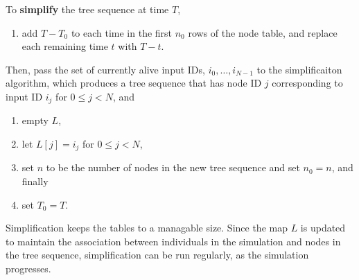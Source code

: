 \documentclass{article}
\begin{document}
To \textbf{simplify} the tree sequence at time $T$,
\begin{enumerate}
    \item add $T-T_0$ to each time in the first $n_0$ rows of the node table,
        and replace each remaining time $t$ with $T-t$.
\end{enumerate}
Then, pass the set of currently alive input IDs,
$i_0, \ldots, i_{N-1}$ to the simplificaiton algorithm,
which produces a tree sequence that has node ID $j$ corresponding to input ID $i_j$
for $0 \le j < N$, and
\begin{enumerate}[resume]
    \item empty $L$,
    \item let $L[j] = i_j$ for $0 \le j < N$,
    \item set $n$ to be the number of nodes in the new tree sequence and set $n_0 = n$, and finally
    \item set $T_0 = T$.
\end{enumerate}

Simplification keeps the tables to a managable size.
Since the map $L$ is updated to maintain the association between individuals in the simulation
and nodes in the tree sequence, simplification can be run regularly, 
as the simulation progresses.
\end{document}

